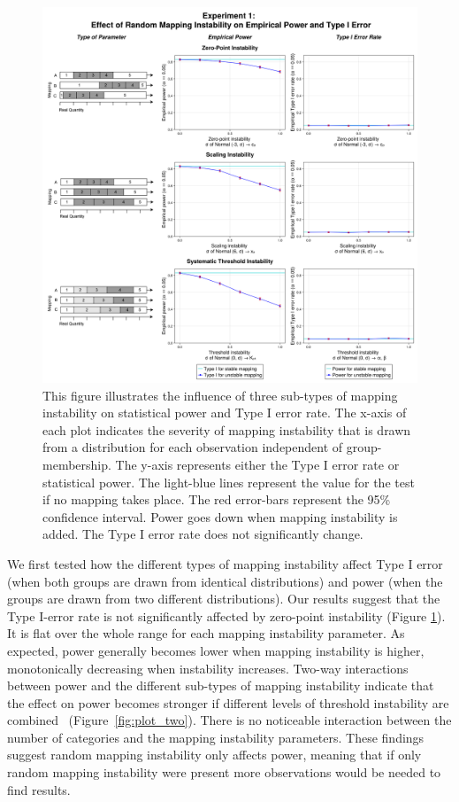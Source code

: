 \documentclass[titlepage, a4paper, 11pt]{article}
\begin{document}
\begin{figure}
    \centering
    \includegraphics[width=1\linewidth]{Plots/measurement_instability_random.png}
    \caption{This figure illustrates the influence of three sub-types of mapping instability on statistical power and Type I error rate. The x-axis of each plot indicates the severity of mapping instability that is drawn from a distribution for each observation independent of group-membership. The y-axis represents either the Type I error rate or statistical power. The light-blue lines represent the value for the test if no mapping takes place. The red error-bars represent the 95\% confidence interval. Power goes down when mapping instability is added. The Type I error rate does not significantly change.}
    \label{fig:plot_one}
\end{figure}

We first tested how the different types of mapping instability affect Type I error (when both groups are drawn from identical distributions) and power (when the groups are drawn from two different distributions). Our results suggest that the Type I-error rate is not significantly affected by zero-point instability (Figure \ref{fig:plot_one}). It is flat over the whole range for each mapping instability parameter. As expected, power generally becomes lower when mapping instability is higher, monotonically decreasing when instability increases.  Two-way interactions between power and the different sub-types of mapping instability indicate that the effect on power becomes stronger if different levels of threshold instability are combined ~(Figure~\ref{fig:plot_two}). There is no noticeable interaction between the number of categories and the mapping instability parameters. These findings suggest random mapping instability only affects power, meaning that if only random mapping instability were present more observations would be needed to find results. 
\end{document}
